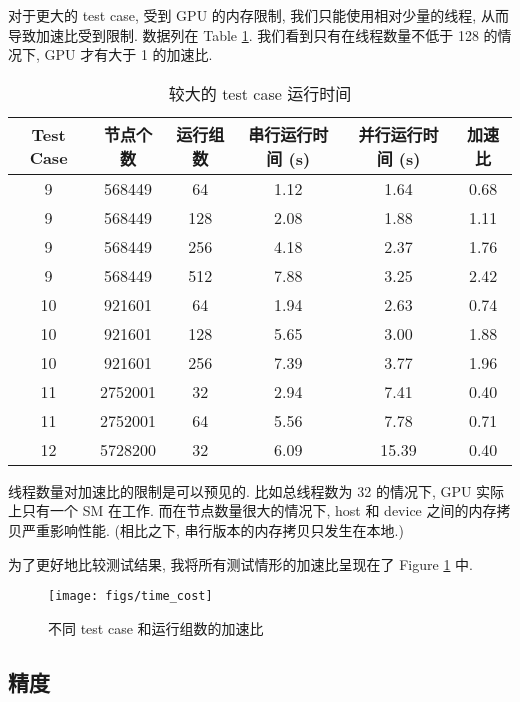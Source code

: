 \documentclass[12pt]{article}
\begin{document}
对于更大的 test case, 受到 GPU 的内存限制, 我们只能使用相对少量的线程, 从而导致加速比受到限制. 数据列在 Table \ref{bigcase}. 我们看到只有在线程数量不低于 128 的情况下, GPU 才有大于 1 的加速比.

\begin{table}
    \caption{较大的 test case 运行时间}
    \label{bigcase}
    \begin{center}
        \begin{tabular}{ ccc|ccc } 
         Test Case & 节点个数 & 运行组数 & 串行运行时间 (s) & 并行运行时间 (s) & 加速比 \\
         \hline
         9 & 568449 & 64 & 1.12 & 1.64 & 0.68 \\
         9 & 568449 & 128 & 2.08 & 1.88 & 1.11 \\
         9 & 568449 & 256 & 4.18 & 2.37 & 1.76 \\
         9 & 568449 & 512 & 7.88 & 3.25 & 2.42 \\
         \hline
         10 & 921601 & 64 & 1.94 & 2.63 & 0.74 \\
         10 & 921601 & 128 & 5.65 & 3.00 & 1.88 \\
         10 & 921601 & 256 & 7.39 & 3.77 & 1.96 \\
         \hline
         11 & 2752001 & 32 & 2.94 & 7.41 & 0.40 \\
         11 & 2752001 & 64 & 5.56 & 7.78 & 0.71 \\
         \hline
         12 & 5728200 & 32 & 6.09 & 15.39 & 0.40 \\
        \end{tabular}
    \end{center}
\end{table}

线程数量对加速比的限制是可以预见的. 比如总线程数为 32 的情况下, GPU 实际上只有一个 SM 在工作. 而在节点数量很大的情况下, host 和 device 之间的内存拷贝严重影响性能. (相比之下, 串行版本的内存拷贝只发生在本地.)

为了更好地比较测试结果, 我将所有测试情形的加速比呈现在了 Figure \ref{timecostfig} 中.

\begin{figure}[]
    \centering
        \texttt{[image: figs/time\_cost]}
    \caption{不同 test case 和运行组数的加速比}
    \label{timecostfig}
\end{figure}



\subsection{精度}
\end{document}
